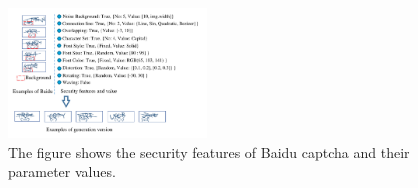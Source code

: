 %

\begin{figure}
  \centering
  \includegraphics[width=0.47\textwidth]{fig/generator/captcha_analysis.pdf}
  \caption{The figure shows the security features of Baidu captcha and their parameter values.}
  \label{fig: captcha_analysis}
\end{figure}




